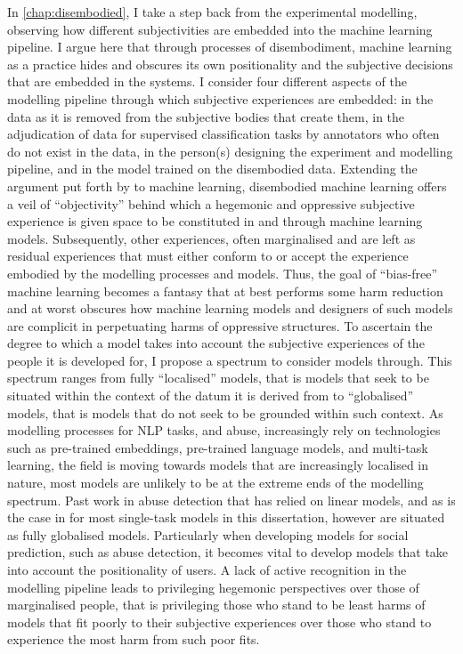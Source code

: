 In \cref{chap:disembodied}, I take a step back from the experimental modelling, observing how different subjectivities are embedded into the machine learning pipeline.
I argue here that through processes of disembodiment, machine learning as a practice hides and obscures its own positionality and the subjective decisions that are embedded in the systems.
I consider four different aspects of the modelling pipeline through which subjective experiences are embedded: in the data as it is removed from the subjective bodies that create them, in the adjudication of data for supervised classification tasks by annotators who often do not exist in the data, in the person(s) designing the experiment and modelling pipeline, and in the model trained on the disembodied data.
Extending the argument put forth by \citet{Haraway:1988} to machine learning, disembodied machine learning offers a veil of ``objectivity'' behind which a hegemonic and oppressive subjective experience is given space to be constituted in and through machine learning models.
Subsequently, other experiences, often marginalised and are left as residual experiences that must either conform to or accept the experience embodied by the modelling processes and models.
Thus, the goal of ``bias-free'' machine learning becomes a fantasy that at best performs some harm reduction and at worst obscures how machine learning models and designers of such models are complicit in perpetuating harms of oppressive structures.
To ascertain the degree to which a model takes into account the subjective experiences of the people it is developed for, I propose a spectrum to consider models through.
This spectrum ranges from fully ``localised'' models, that is models that seek to be situated within the context of the datum it is derived from to ``globalised'' models, that is models that do not seek to be grounded within such context.
As modelling processes for NLP tasks, and abuse, increasingly rely on technologies such as pre-trained embeddings, pre-trained language models, and multi-task learning, the field is moving towards models that are increasingly localised in nature, most models are unlikely to be at the extreme ends of the modelling spectrum.
Past work in abuse detection that has relied on linear models, and as is the case in for most single-task models in this dissertation, however are situated as fully globalised models.
Particularly when developing models for social prediction, such as abuse detection, it becomes vital to develop models that take into account the positionality of users.
A lack of active recognition in the modelling pipeline leads to privileging hegemonic perspectives over those of marginalised people, that is privileging those who stand to be least harms of models that fit poorly to their subjective experiences over those who stand to experience the most harm from such poor fits.
